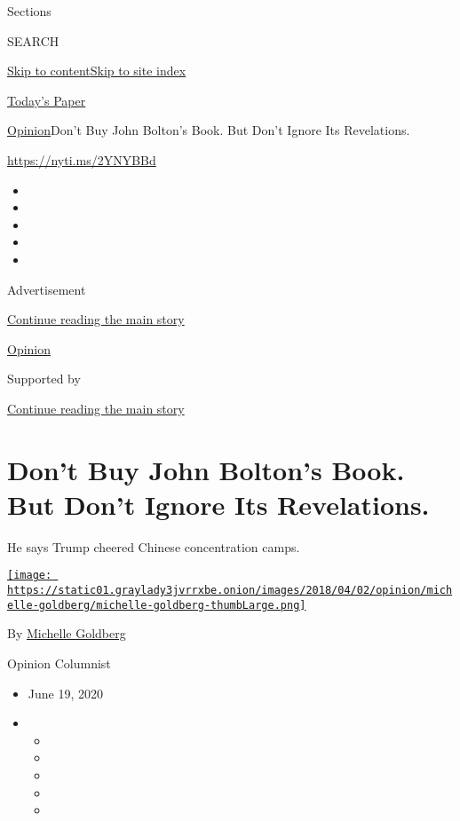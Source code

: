 Sections

SEARCH

\protect\hyperlink{site-content}{Skip to
content}\protect\hyperlink{site-index}{Skip to site index}

\href{https://myaccount.nytimes3xbfgragh.onion/auth/login?response_type=cookie\&client_id=vi}{}

\href{https://www.nytimes3xbfgragh.onion/section/todayspaper}{Today's
Paper}

\href{/section/opinion}{Opinion}\textbar{}Don't Buy John Bolton's Book.
But Don't Ignore Its Revelations.

\url{https://nyti.ms/2YNYBBd}

\begin{itemize}
\item
\item
\item
\item
\item
\end{itemize}

Advertisement

\protect\hyperlink{after-top}{Continue reading the main story}

\href{/section/opinion}{Opinion}

Supported by

\protect\hyperlink{after-sponsor}{Continue reading the main story}

\hypertarget{dont-buy-john-boltons-book-but-dont-ignore-its-revelations}{%
\section{Don't Buy John Bolton's Book. But Don't Ignore Its
Revelations.}\label{dont-buy-john-boltons-book-but-dont-ignore-its-revelations}}

He says Trump cheered Chinese concentration camps.

\href{https://www.nytimes3xbfgragh.onion/by/michelle-goldberg}{\texttt{[image: https://static01.graylady3jvrrxbe.onion/images/2018/04/02/opinion/michelle-goldberg/michelle-goldberg-thumbLarge.png]}}

By
\href{https://www.nytimes3xbfgragh.onion/by/michelle-goldberg}{Michelle
Goldberg}

Opinion Columnist

\begin{itemize}
\item
  June 19, 2020
\item
  \begin{itemize}
  \item
  \item
  \item
  \item
  \item
  \end{itemize}
\end{itemize}

